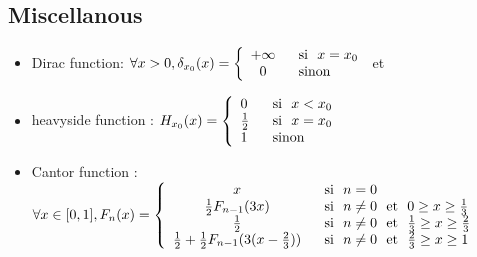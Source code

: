 \subsection{Miscellanous}
\begin{itemize}
\item Dirac function: $\forall x>0,\delta_{x_0}(x)=
\left\{
\begin{array}{cl}
+\infty & \textrm{~~si~~} x=x_0\\
0 & \textrm{~~sinon~~}
\end{array}
\right.
$ et
\item heavyside function : $H_{x_0}(x)=
\left\{
\begin{array}{ll}
0 & \textrm{~~si~~} x<x_0\\
\frac{1}{2} & \textrm{~~si~~} x=x_0\\
1 & \textrm{~~sinon~~}
\end{array}
\right.
$
\item Cantor function : $\forall x\in [0,1], F_n(x)=
\left\{
\begin{array}{cl}
x & \textrm{~~si~~} n=0\\
\frac{1}{2}F_{n-1}(3x) & \textrm{~~si~~} n\neq 0 \textrm{~~et~~} 0\geq x\geq \frac{1}{3}\\
\frac{1}{2} & \textrm{~~si~~} n\neq 0 \textrm{~~et~~} \frac{1}{3}\geq x\geq \frac{2}{3}\\
\frac{1}{2} +\frac{1}{2}F_{n-1}(3(x-\frac{2}{3}))& \textrm{~~si~~} n\neq 0 \textrm{~~et~~} \frac{2}{3}\geq x\geq 1\\
\end{array}
\right.$

\end{itemize}

